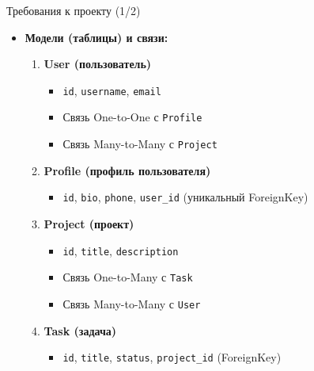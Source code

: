 \documentclass{beamer}
\begin{document}
\begin{frame}{Требования к проекту (1/2)}
	\begin{itemize}
		\item \textbf{Модели (таблицы) и связи:}
		      \begin{enumerate}
			      \item \textbf{User (пользователь)}
			            \begin{itemize}
				            \item \texttt{id}, \texttt{username}, \texttt{email}
				            \item Связь One-to-One с \texttt{Profile}
				            \item Связь Many-to-Many с \texttt{Project}
			            \end{itemize}
			      \item \textbf{Profile (профиль пользователя)}
			            \begin{itemize}
				            \item \texttt{id}, \texttt{bio}, \texttt{phone}, \texttt{user\_id} (уникальный ForeignKey)
			            \end{itemize}
			      \item \textbf{Project (проект)}
			            \begin{itemize}
				            \item \texttt{id}, \texttt{title}, \texttt{description}
				            \item Связь One-to-Many с \texttt{Task}
				            \item Связь Many-to-Many с \texttt{User}
			            \end{itemize}
			      \item \textbf{Task (задача)}
			            \begin{itemize}
				            \item \texttt{id}, \texttt{title}, \texttt{status}, \texttt{project\_id} (ForeignKey)
			            \end{itemize}
		      \end{enumerate}
	\end{itemize}
\end{frame}
\end{document}
